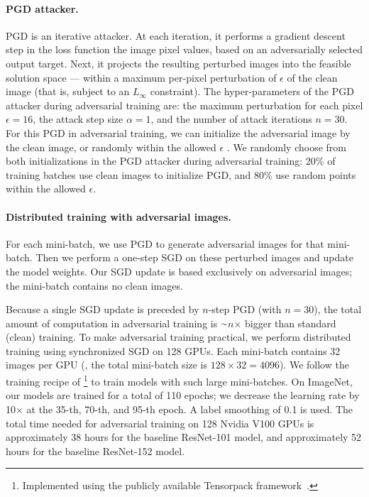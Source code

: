 \documentclass[10pt,twocolumn,letterpaper]{article}
\newcommand{\app}{\raise.17ex\hbox{$\scriptstyle\sim$}}
\begin{document}
\paragraph{PGD attacker.}
PGD is an iterative attacker.
At each iteration, it performs a gradient descent step in the loss function \wrt the image pixel values, based on an adversarially selected output target.
Next, it projects the resulting perturbed images into the feasible solution space --- within a maximum per-pixel perturbation of $\epsilon$ of the clean image (that is, subject to an $L_\infty$ constraint). The hyper-parameters of the PGD attacker during adversarial training are: the maximum perturbation for each pixel $\epsilon \!=\! 16$, the attack step size $\alpha \!=\! 1$, and the number of attack iterations $n \!=\! 30$.
For this PGD in adversarial training, we can initialize the adversarial image by the clean image, or randomly within the allowed $\epsilon$ \cite{Madry2018}. We randomly choose from both initializations in the PGD attacker during adversarial training: 20\% of training batches use clean images to initialize PGD, and 80\% use random points within the allowed $\epsilon$.

\paragraph{Distributed training with adversarial images.} For each mini-batch, we use PGD to generate adversarial images for that mini-batch. Then we perform a one-step SGD on these perturbed images and update the model weights. Our SGD update is based exclusively on adversarial images; the mini-batch contains no clean images.

Because a single SGD update is preceded by $n$-step PGD (with $n \!=\! 30$), the total amount of computation in adversarial training is $\app$$n$$\times$ bigger than standard (clean) training. To make adversarial training practical, we perform distributed training using synchronized SGD on 128 GPUs. Each mini-batch contains 32 images per GPU (\ie, the total mini-batch size is $128 \!\times\! 32 \!=\! 4096$). We follow the training recipe of \cite{Goyal2017}\footnote{Implemented using the publicly available Tensorpack framework~\cite{Wu2016}.} to train models with such large mini-batches. 
On ImageNet, our models are trained for a total of 110 epochs; we decrease the learning rate by 10$\times$ at the 35-th, 70-th, and 95-th epoch. A label smoothing \cite{Szegedy2016a} of 0.1 is used.
The total time needed for adversarial training on 128 Nvidia V100 GPUs is  approximately 38 hours for the baseline ResNet-101 model, and approximately 52 hours for the baseline ResNet-152 model.
\end{document}
